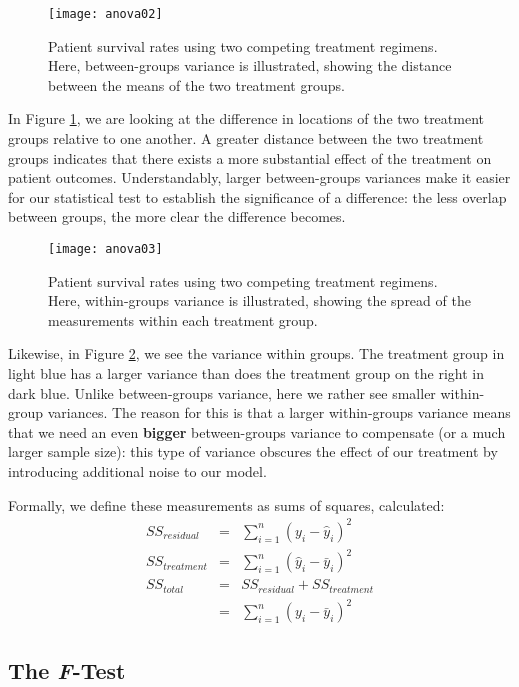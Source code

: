 \begin{figure}[h]
\texttt{[image: anova02]}
\label{fig:anova02}
\caption{Patient survival rates using two competing treatment regimens. Here, between-groups variance is illustrated, showing the distance between the means of the two treatment groups.}
\end{figure}

In Figure \ref{fig:anova02}, we are looking at the difference in locations of the two treatment groups relative to one another. A greater distance between the two treatment groups indicates that there exists a more substantial effect of the treatment on patient outcomes. Understandably, larger between-groups variances make it easier for our statistical test to establish the significance of a difference: the less overlap between groups, the more clear the difference becomes.

\begin{figure}[h]
\texttt{[image: anova03]}
\label{fig:anova03}
\caption{Patient survival rates using two competing treatment regimens. Here, within-groups variance is illustrated, showing the spread of the measurements within each treatment group.}
\end{figure}

Likewise, in Figure \ref{fig:anova03}, we see the variance within groups. The treatment group in light blue has a larger variance than does the treatment group on the right in dark blue. Unlike between-groups variance, here we rather see smaller within-group variances. The reason for this is that a larger within-groups variance means that we need an even \textbf{bigger} between-groups variance to compensate (or a much larger sample size): this type of variance obscures the effect of our treatment by introducing additional noise to our model.

Formally, we define these measurements as sums of squares, calculated:
\begin{eqnarray*}
SS_{residual} &=& \sum_{i=1}^n \left(y_i - \hat{y}_i\right)^2 \\
SS_{treatment} &=& \sum_{i=1}^n \left(\hat{y}_i-\bar{y}_i\right)^2 \\
SS_{total} &=& SS_{residual}+SS_{treatment} \\
&=& \sum_{i=1}^n\left(y_i-\bar{y}_i\right)^2
\end{eqnarray*}

\subsection{The \textit{F}-Test}

